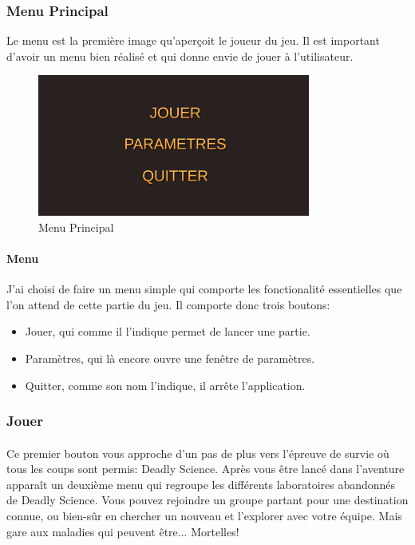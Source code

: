 \documentclass{article}
\begin{document}
\subsubsection{Menu Principal}

Le menu est la première image qu'aperçoit le joueur du jeu. Il est important d'avoir un menu bien réalisé et qui donne envie de jouer à l'utilisateur.

\par\vspace{0.5cm}
\begin{figure}[!h]
    \centering
    \includegraphics[width=0.8\textwidth]{MainMenu.png}
    \caption{Menu Principal}
    \label{Main Menu}
\end{figure}{}

\paragraph{Menu}

J'ai choisi de faire un menu simple qui comporte les fonctionalité essentielles que l'on attend de cette partie du jeu. Il comporte donc trois boutons:

\begin{itemize}
    \item Jouer, qui comme il l'indique permet de lancer une partie.
    \item Paramètres, qui là encore ouvre une fenêtre de paramètres.
    \item Quitter, comme son nom l'indique, il arrête l'application.
\end{itemize}

\subsubsection{Jouer}

\paragraph{}
Ce premier bouton vous approche d'un pas de plus vers l'épreuve de survie où tous les coups sont permis: Deadly Science. Après vous être lancé dans l'aventure apparaît un deuxième menu qui regroupe les différents laboratoires abandonnés de Deadly Science. Vous pouvez rejoindre un groupe partant pour une destination connue, ou bien-sûr en chercher un nouveau et l'explorer avec votre équipe. Mais gare aux maladies qui peuvent être... Mortelles!
\end{document}
